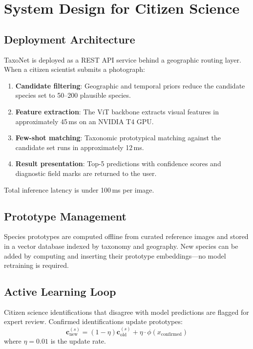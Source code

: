 \section{System Design for Citizen Science}

\label{sec:system}

\subsection{Deployment Architecture}

TaxoNet is deployed as a REST API service behind a geographic routing
layer. When a citizen scientist submits a photograph:

\begin{enumerate}
  \item \textbf{Candidate filtering}: Geographic and temporal priors
    reduce the candidate species set to 50--200 plausible species.
  \item \textbf{Feature extraction}: The ViT backbone extracts visual
    features in approximately 45\,ms on an NVIDIA T4 GPU.
  \item \textbf{Few-shot matching}: Taxonomic prototypical matching
    against the candidate set runs in approximately 12\,ms.
  \item \textbf{Result presentation}: Top-5 predictions with confidence
    scores and diagnostic field marks are returned to the user.
\end{enumerate}

Total inference latency is under 100\,ms per image.

\subsection{Prototype Management}

Species prototypes are computed offline from curated reference images and
stored in a vector database indexed by taxonomy and geography. New
species can be added by computing and inserting their prototype
embeddings---no model retraining is required.

\subsection{Active Learning Loop}

Citizen science identifications that disagree with model predictions
are flagged for expert review. Confirmed identifications update
prototypes:
\begin{equation}
  \mathbf{c}_{\text{new}}^{(s)} = (1 - \eta) \mathbf{c}_{\text{old}}^{(s)}
  + \eta \cdot \phi(x_{\text{confirmed}})
\end{equation}
where $\eta = 0.01$ is the update rate.


